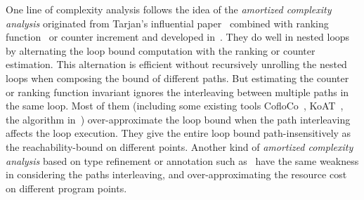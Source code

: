 \begin{itemize}
One line of complexity analysis follows the idea of the \emph{amortized complexity analysis} originated from Tarjan's influential paper~\cite{PotechinP17} combined with ranking function~\cite{BradleyMS05,CookSZ13,Zuleger18} or counter increment and developed in~\cite{ZulegerGSV11,SinnZV14,SinnZV17,LuCT21,AliasDFG10}.
They do well in nested loops by alternating the loop bound computation with the ranking or counter estimation. This alternation is efficient without recursively unrolling the nested loops when composing the bound of different paths.
  But estimating the counter or ranking function invariant ignores the interleaving between multiple paths in the same loop.
Most of them (including some existing tools CofloCo~\cite{Montoya17,Flores-MontoyaH14,Flores-Montoya16}, KoAT~\cite{BrockschmidtEFFG16,BrockschmidtEFFG14,FalkeKS12,FalkeKS11}, the algorithm in~\cite{LuCT21}) over-approximate the loop bound when the path interleaving affects the loop execution. They give the entire loop bound path-insensitively as the reachability-bound on different points. Another kind of \emph{amortized complexity analysis} based on type refinement or annotation such as~\cite{CraryW00,JostHLH10,CicekBG0H17,RajaniG0021,CarbonneauxHS15} have the same weakness in considering the paths interleaving, and over-approximating the resource cost on different program points.


\end{itemize}
